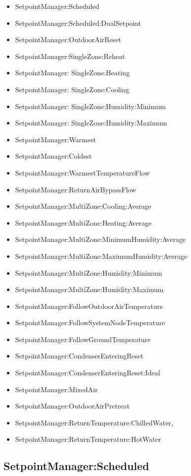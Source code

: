 \begin{itemize}
\item
  SetpointManager:Scheduled
\item
  SetpointManager:Scheduled:DualSetpoint
\item
  SetpointManager:OutdoorAirReset
\item
  SetpointManager:SingleZone:Reheat
\item
  SetpointManager: SingleZone:Heating
\item
  SetpointManager: SingleZone:Cooling
\item
  SetpointManager: SingleZone:Humidity:Minimum
\item
  SetpointManager: SingleZone:Humidity:Maximum
\item
  SetpointManager:Warmest
\item
  SetpointManager:Coldest
\item
  SetpointManager:WarmestTemperatureFlow
\item
  SetpointManager:ReturnAirBypassFlow
\item
  SetpointManager:MultiZone:Cooling:Average
\item
  SetpointManager:MultiZone:Heating:Average
\item
  SetpointManager:MultiZone:MinimumHumidity:Average
\item
  SetpointManager:MultiZone:MaximumHumidity:Average
\item
  SetpointManager:MultiZone:Humidity:Minimum
\item
  SetpointManager:MultiZone:Humidity:Maximum
\item
  SetpointManager:FollowOutdoorAirTemperature
\item
  SetpointManager:FollowSystemNodeTemperature
\item
  SetpointManager:FollowGroundTemperature
\item
  SetpointManager:CondenserEnteringReset
\item
  SetpointManager:CondenserEnteringReset:Ideal
\item
  SetpointManager:MixedAir
\item
  SetpointManager:OutdoorAirPretreat
\item
  SetpointManager:ReturnTemperature:ChilledWater,
\item
  SetpointManager:ReturnTemperature:HotWater
\end{itemize}

\subsection{SetpointManager:Scheduled}\label{setpointmanagerscheduled}

